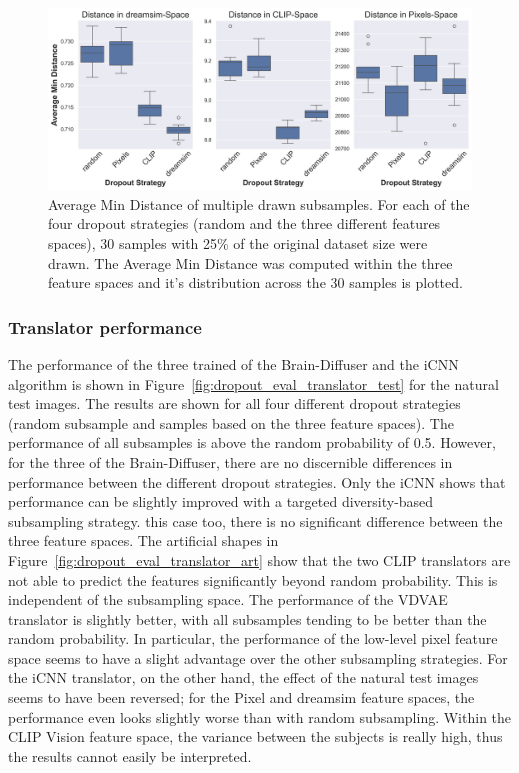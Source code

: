 \begin{figure}[ht]
  \centering
  \includegraphics[width=1\textwidth]{plots/dropout_avg_min_distance.png}
  \caption[Average Min Distance with different dropout strategies]{Average Min Distance of multiple drawn subsamples. For each of the four dropout strategies (random and the three different features spaces), 30 samples with 25\% of the original dataset size were drawn. The Average Min Distance was computed within the three feature spaces and it's distribution across the 30 samples is plotted.}\label{fig:dropout_avg_min_distance}
\end{figure}


\subsubsection{Translator performance}
The performance of the three trained  of the Brain-Diffuser and the iCNN algorithm is shown in Figure~\ref{fig:dropout_eval_translator_test} for the natural test images. The results are shown for all four different dropout strategies (random subsample and samples based on the three feature spaces). The performance of all subsamples is above the random probability of 0.5. However, for the three  of the Brain-Diffuser, there are no discernible differences in performance between the different dropout strategies. Only the iCNN  shows that performance can be slightly improved with a targeted diversity-based subsampling strategy.  this case too, there is no significant difference between the three feature spaces. The artificial shapes in Figure~\ref{fig:dropout_eval_translator_art} show that the two CLIP translators are not able to predict the features significantly beyond random probability. This is independent of the subsampling space. The performance of the VDVAE translator is slightly better, with all subsamples tending to be better than the random probability. In particular, the performance of the low-level pixel feature space seems to have a slight advantage over the other subsampling strategies. For the iCNN translator, on the other hand, the effect of the natural test images seems to have been reversed; for the Pixel and dreamsim feature spaces, the performance even looks slightly worse than with random subsampling. Within the CLIP Vision feature space, the variance between the subjects is really high, thus the results cannot easily be interpreted.

